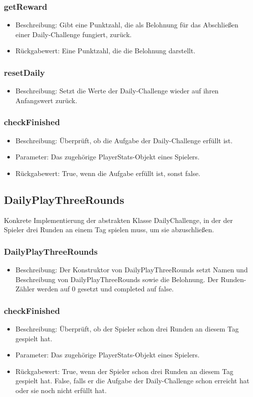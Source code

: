 \documentclass[a4paper]{scrreprt}
\begin{document}
	\subsubsection{getReward}
	\begin{itemize}
		\item Beschreibung: Gibt eine Punktzahl, die als Belohnung für das Abschließen einer Daily-Challenge fungiert, zurück.
		\item Rückgabewert: Eine Punktzahl, die die Belohnung darstellt.
	\end{itemize}
	\subsubsection{resetDaily}
	\begin{itemize}
		\item Beschreibung: Setzt die Werte der Daily-Challenge wieder auf ihren Anfangswert zurück.
	\end{itemize}
	\subsubsection{checkFinished}
	\begin{itemize}
		\item Beschreibung: Überprüft, ob die Aufgabe der Daily-Challenge erfüllt ist.
		\item Parameter: Das zugehörige PlayerStats-Objekt eines Spielers.
		\item Rückgabewert: True, wenn die Aufgabe erfüllt ist, sonst false.
	\end{itemize}

	\subsection{DailyPlayThreeRounds}
	Konkrete Implementierung der abstrakten Klasse DailyChallenge, in der der Spieler drei Runden an einem Tag spielen muss, um sie abzuschließen.
	\subsubsection{DailyPlayThreeRounds}
	\begin{itemize}
		\item Beschreibung: Der Konstruktor von DailyPlayThreeRounds setzt Namen und Beschreibung von DailyPlayThreeRounds sowie die Belohnung. Der Runden-Zähler werden auf 0 gesetzt und completed auf false.
	\end{itemize}
	\subsubsection{checkFinished}
	\begin{itemize}
		\item Beschreibung: Überprüft, ob der Spieler schon drei Runden an diesem Tag gespielt hat.
		\item Parameter: Das zugehörige PlayerStats-Objekt eines Spielers.
		\item Rückgabewert: True, wenn der Spieler schon drei Runden an diesem Tag gespielt hat. False, falls er die Aufgabe der Daily-Challenge schon erreicht hat oder sie noch nicht erfüllt hat.
	\end{itemize}
\end{document}
